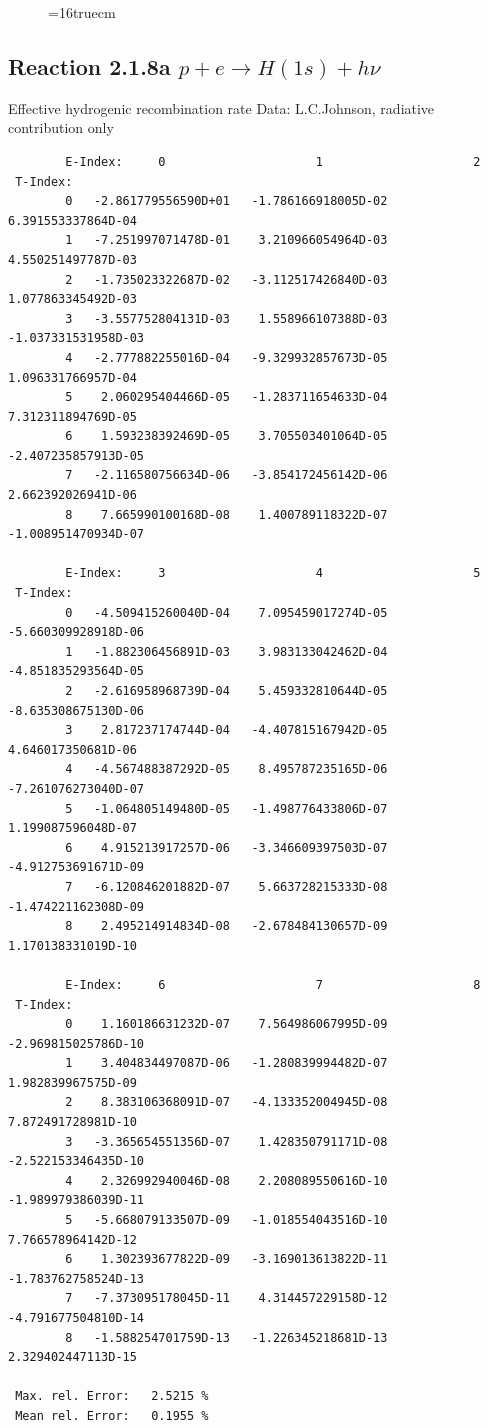 \documentclass[12pt,dvips]{article}
\begin{document}
\begin{figure} \label{2.1.8FU}
\epsfxsize=16truecm
\end{figure}
\newpage


\subsection{
  Reaction 2.1.8a  $p + e \rightarrow H(1s) + h\nu $
}

   Effective hydrogenic recombination rate
   Data: L.C.Johnson, radiative contribution only


\begin{small}\begin{verbatim}
        E-Index:     0                     1                     2
 T-Index:
        0   -2.861779556590D+01   -1.786166918005D-02    6.391553337864D-04
        1   -7.251997071478D-01    3.210966054964D-03    4.550251497787D-03
        2   -1.735023322687D-02   -3.112517426840D-03    1.077863345492D-03
        3   -3.557752804131D-03    1.558966107388D-03   -1.037331531958D-03
        4   -2.777882255016D-04   -9.329932857673D-05    1.096331766957D-04
        5    2.060295404466D-05   -1.283711654633D-04    7.312311894769D-05
        6    1.593238392469D-05    3.705503401064D-05   -2.407235857913D-05
        7   -2.116580756634D-06   -3.854172456142D-06    2.662392026941D-06
        8    7.665990100168D-08    1.400789118322D-07   -1.008951470934D-07

        E-Index:     3                     4                     5
 T-Index:
        0   -4.509415260040D-04    7.095459017274D-05   -5.660309928918D-06
        1   -1.882306456891D-03    3.983133042462D-04   -4.851835293564D-05
        2   -2.616958968739D-04    5.459332810644D-05   -8.635308675130D-06
        3    2.817237174744D-04   -4.407815167942D-05    4.646017350681D-06
        4   -4.567488387292D-05    8.495787235165D-06   -7.261076273040D-07
        5   -1.064805149480D-05   -1.498776433806D-07    1.199087596048D-07
        6    4.915213917257D-06   -3.346609397503D-07   -4.912753691671D-09
        7   -6.120846201882D-07    5.663728215333D-08   -1.474221162308D-09
        8    2.495214914834D-08   -2.678484130657D-09    1.170138331019D-10

        E-Index:     6                     7                     8
 T-Index:
        0    1.160186631232D-07    7.564986067995D-09   -2.969815025786D-10
        1    3.404834497087D-06   -1.280839994482D-07    1.982839967575D-09
        2    8.383106368091D-07   -4.133352004945D-08    7.872491728981D-10
        3   -3.365654551356D-07    1.428350791171D-08   -2.522153346435D-10
        4    2.326992940046D-08    2.208089550616D-10   -1.989979386039D-11
        5   -5.668079133507D-09   -1.018554043516D-10    7.766578964142D-12
        6    1.302393677822D-09   -3.169013613822D-11   -1.783762758524D-13
        7   -7.373095178045D-11    4.314457229158D-12   -4.791677504810D-14
        8   -1.588254701759D-13   -1.226345218681D-13    2.329402447113D-15

 Max. rel. Error:   2.5215 %
 Mean rel. Error:   0.1955 %


\end{verbatim}\end{small}
\end{document}
